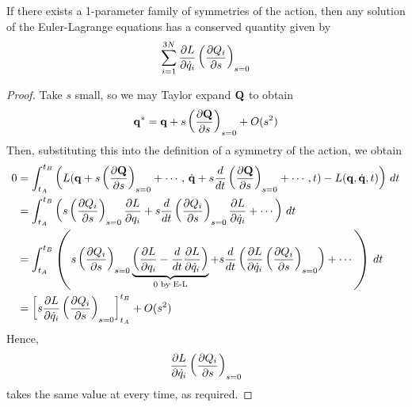 \documentclass{../../template/note}
\begin{document}
    \begin{theorem}
        If there exists a 1-parameter family of symmetries of the action, then any solution of the Euler-Lagrange equations has a conserved quantity given by
        \begin{align*}
            \sum_{i=1}^{3N} \pd{L}{\dot q_i} \left(\pd{Q_i}{s}\right)_{s=0}
        \end{align*}
    \end{theorem}
    
    \begin{proof}
        Take $s$ small, so we may Taylor expand $\V Q$ to obtain
        \begin{align*}
            \V q^* = \V q + s\left(\pd{\V Q}{s}\right)_{s=0} + O(s^2)
        \end{align*}
        Then, substituting this into the definition of a symmetry of the action, we obtain
        \begin{align*}
            0 & = \int_{t_A}^{t_B} \left(L(\V q + s \left(\pd{\V Q}{s}\right)_{s=0} + \cdots,\, \dot{\V q} + s \frac{d}{dt}\left(\pd{\V Q}{s}\right)_{s=0} + \cdots, t) - L(\V q, \dot{\V q}, t)\right) \D t \\
            &= \int_{t_A}^{t_B} \left(s \left(\pd{Q_i}{s}\right)_{s=0} \pd{L}{q_i} + s \frac{d}{dt} \left(\pd{Q_i}{s}\right)_{s=0} \pd{L}{\dot q_i} + \cdots\right) \D t \\
            &= \int_{t_A}^{t_B} \left(s \left(\pd{Q_i}{s}\right)_{s=0} \underbrace{\left(\pd{L}{q_i} - \frac{d}{dt} \pd{L}{\dot q_i}\right)}_{0 \text{ by E-L}} + s \frac{d}{dt} \left( \pd{L}{\dot q_i} \left(\pd{Q_i}{s}\right)_{s=0} \right) + \cdots\right) \D t \\
            &= \left[s \pd{L}{\dot q_i} \left(\pd{Q_i}{s}\right)_{s=0}\right]_{t_A}^{t_B} + O(s^2)
        \end{align*}
        Hence,
        \begin{align*}
            \pd{L}{\dot q_i} \left(\pd{Q_i}{s}\right)_{s=0}
        \end{align*}
        takes the same value at every time, as required.  
    \end{proof}
    
\end{document}
